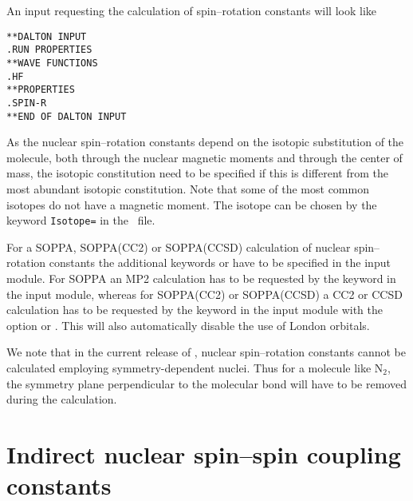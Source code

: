 An input requesting the calculation of spin--rotation constants will
look like

\begin{verbatim}
**DALTON INPUT
.RUN PROPERTIES
**WAVE FUNCTIONS
.HF
**PROPERTIES
.SPIN-R
**END OF DALTON INPUT
\end{verbatim}

As the nuclear spin--rotation constants
depend on the isotopic substitution of
the molecule, both through the nuclear magnetic moments and through the
center of mass, the isotopic constitution need to be specified if this
is different  from the most abundant isotopic constitution. Note that
some of the most common isotopes do not have a magnetic moment. The isotope can be chosen by the keyword \verb|Isotope=| in the \molinp\ file.

For a SOPPA, SOPPA(CC2) or
SOPPA(CCSD) calculation of nuclear spin--rotation
constants the additional keywords  or  have
to be specified in the  input module. For SOPPA an MP2
calculation has to be requested by the keyword  in the
 input module, whereas for SOPPA(CC2) or
SOPPA(CCSD) a CC2 or CCSD calculation has to be requested by the
keyword  in the  input module with the  option
 or . This will also automatically disable
the use of London orbitals.

We note that in the current release of \dalton, nuclear spin--rotation
constants cannot be calculated employing symmetry-dependent nuclei.
Thus for a molecule like N$_2$, the symmetry plane perpendicular to the
molecular bond will have to be removed during the calculation.

\section{Indirect nuclear spin--spin coupling
constants}\label{sec:spinspin}

